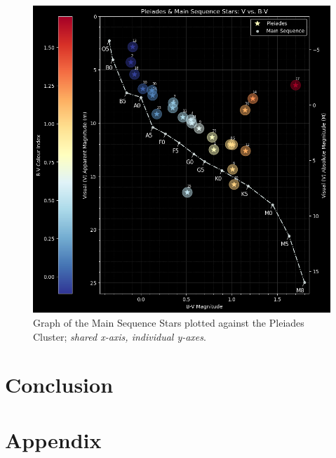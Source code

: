 \documentclass[12pt]{article}
\begin{document}
\begin{figure}[H]
    \centering
    \includegraphics[width=12.5cm]{pleiadesms graph.png}
    \caption{\centering Graph of the Main Sequence Stars plotted against the Pleiades Cluster; \textit{shared x-axis, individual y-axes}.}
    \label{fig:pleimsgraph}
\end{figure}




\section{Conclusion} \label{sec:4}


\newpage



 \label{sec:ref}

\vspace{1.5cm}

\listoffigures

\listoftables

\newpage

\section*{Appendix} \label{sec:A}
\end{document}
